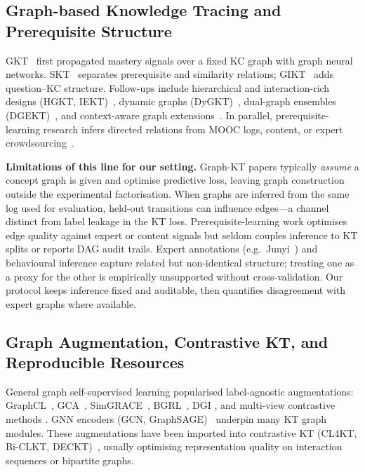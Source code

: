 \documentclass[pdflatex,sn-basic]{sn-jnl}
\begin{document}
\subsection{Graph-based Knowledge Tracing and Prerequisite Structure}
\label{sec:related-graphkt}
GKT~\cite{nakagawa2019gkt} first propagated mastery signals over a
fixed KC graph with graph neural networks. SKT~\cite{tong2020skt}
separates prerequisite and similarity relations; GIKT~\cite{yang2021gikt}
adds question--KC structure. Follow-ups include hierarchical and
interaction-rich designs (HGKT, IEKT)~\cite{chen2023hgkt,liu2021iekt}, dynamic graphs (DyGKT)~\cite{dygkt2024},
dual-graph ensembles (DGEKT)~\cite{dgekt2024}, and context-aware graph
extensions~\cite{huang2022hawkt}. In parallel,
prerequisite-learning research infers directed relations from MOOC logs,
content, or expert crowdsourcing~\cite{lin2016moocprereq,pan2020concept,chen2020dlprereq,laguna2018prereq,bai2025survey,chang2015junyi}.

\textbf{Limitations of this line for our setting.}
Graph-KT papers typically \emph{assume} a concept graph is given and
optimise predictive loss, leaving graph construction outside the
experimental factorisation. When graphs are inferred from the same log
used for evaluation, held-out transitions can influence edges---a
channel distinct from label leakage in the KT loss. Prerequisite-learning
work optimises edge quality against expert or content signals but seldom
couples inference to KT splits or reports DAG audit trails. Expert
annotations (e.g.\ Junyi~\cite{chang2015junyi,junyi_dataset}) and
behavioural inference capture related but non-identical structure; treating
one as a proxy for the other is empirically unsupported without
cross-validation. Our protocol keeps inference fixed and auditable, then
quantifies disagreement with expert graphs where available.

\subsection{Graph Augmentation, Contrastive KT, and Reproducible Resources}
\label{sec:related-aug}
General graph self-supervised learning popularised label-agnostic
augmentations: GraphCL~\cite{you2020graphcl}, GCA~\cite{zhu2021gca},
SimGRACE~\cite{xia2022simgrace}, BGRL~\cite{thakoor2021bgrl}, DGI
\cite{velickovic2018dgi}, and multi-view contrastive methods
\cite{hassani2020mvgrl,zhu2020graphtsa,feng2022graphmvp}. GNN encoders
(GCN, GraphSAGE)~\cite{kipf2017gcn,hamilton2017graphsage} underpin many
KT graph modules. These augmentations have been imported into contrastive
KT (CL4KT, Bi-CLKT, DECKT)~\cite{lee2022cl4kt,song2022biclkt,deckt2025}, usually optimising representation quality on
interaction sequences or bipartite graphs.
\end{document}
